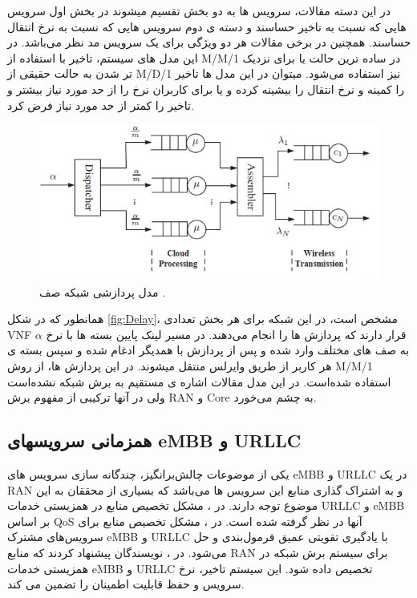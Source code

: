 در این دسته مقالات، سرویس ها به دو بخش تقسیم میشوند در بخش اول سرویس هایی که  نسبت به تاخیر حساسند و دسته ی دوم سرویس هایی که نسبت به نرخ انتقال حساسند. همچنین در برخی مقالات هر دو ویژگی برای یک سرویس مد نظر می‌باشد.
در این مدل های سیستم، تاخیر با استفاده از M/M/1 در ساده ترین حالت یا برای نزدیک تر شدن به حالت حقیقی از M/D/1 نیز استفاده می‌شود. میتوان در این مدل ها تاخیر را کمینه و نرخ انتقال را بیشینه کرده و یا 
برای کاربران نرخ را از حد مورد نیاز بیشتر و تاخیر را کمتر از حد مورد نیاز فرض کرد\cite{frdl,luong2018novel,luong2018novel1,guo2016exploiting}.
 \begin{figure}%
  \centering
    \includegraphics[scale = 0.7]{./fig/Delay}
  \caption{مدل پردازشی شبکه صف \cite{frdl}.}
  \label{fig:Delay}
\end{figure}
همانطور که در شکل \eqref{fig:Delay}، مشخص است، در این شبکه برای هر بخش تعدادی VNF قرار دارند که پردازش ها را انجام می‌دهند. در مسیر لینک پایین
بسته ها با نرخ $\alpha$ به صف های مختلف وارد شده و پس از پردازش با همدیگر ادغام شده و سپس بسته ی هر کاربر از طریق وایرلس منتقل میشوند.
در این پردازش ها، از روش M/M/1 استفاده شده‌است.
در این مدل مقالات اشاره ی مستقیم به برش شبکه نشده‌است ولی
در آنها ترکیبی از مفهوم برش RAN و Core به چشم می‌خورد.
\subsection{همزمانی سرویسهای eMBB و URLLC}
یکی از موضوعات چالش‌برانگیز، چندگانه سازی 
 سرویس های eMBB و URLLC در یک RAN و به اشتراک گذاری منابع این سرویس ها می‌باشد که بسیاری از محققان به این موضوع توجه دارند.
 در \cite{setayesh2020joint,yang2020should,saggese2021power}، مشکل تخصیص منابع در همزیستی خدمات URLLC و eMBB بر اساس QoS آنها در نظر گرفته شده است.
 در \cite{alsenwi2021intelligent}، مشکل تخصیص منابع برای سرویس‌های مشترک eMBB و URLLC با یادگیری تقویتی عمیق فرمول‌بندی و حل می‌شود.
 در \cite{korrai2020ran}، نویسندگان پیشنهاد کردند که منابع RAN برای سیستم برش شبکه در همزیستی خدمات eMBB و URLLC تخصیص داده شود. این سیستم تاخیر، نرخ سرویس و حفظ قابلیت اطمینان را تضمین می کند.
